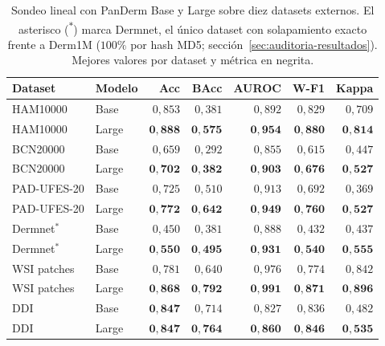 \begin{table}[htbp]
\centering
\footnotesize
\setlength{\tabcolsep}{4pt}
\renewcommand{\arraystretch}{0.95}
\caption{Sondeo lineal con PanDerm Base y Large sobre diez datasets
externos. El asterisco (\textsuperscript{$\ast$}) marca Dermnet, el
único dataset con solapamiento exacto frente a Derm1M ($100\%$ por
hash MD5; sección~\ref{sec:auditoria-resultados}).
Mejores valores por dataset y métrica en negrita.}
\label{tab:lp-panderm}
\begin{tabular}{llrrrrr}
\hline
Dataset       & Modelo & Acc            & BAcc           & AUROC          & W-F1           & Kappa \\
\hline
HAM10000      & Base   & $0{,}853$      & $0{,}381$      & $0{,}892$      & $0{,}829$      & $0{,}709$ \\
HAM10000      & Large  & $\mathbf{0{,}888}$ & $\mathbf{0{,}575}$ & $\mathbf{0{,}954}$ & $\mathbf{0{,}880}$ & $\mathbf{0{,}814}$ \\
BCN20000      & Base   & $0{,}659$      & $0{,}292$      & $0{,}855$      & $0{,}615$      & $0{,}447$ \\
BCN20000      & Large  & $\mathbf{0{,}702}$ & $\mathbf{0{,}382}$ & $\mathbf{0{,}903}$ & $\mathbf{0{,}676}$ & $\mathbf{0{,}527}$ \\
PAD-UFES-20   & Base   & $0{,}725$      & $0{,}510$      & $0{,}913$      & $0{,}692$      & $0{,}369$ \\
PAD-UFES-20   & Large  & $\mathbf{0{,}772}$ & $\mathbf{0{,}642}$ & $\mathbf{0{,}949}$ & $\mathbf{0{,}760}$ & $\mathbf{0{,}527}$ \\
Dermnet$^\ast$& Base   & $0{,}450$      & $0{,}381$      & $0{,}888$      & $0{,}432$      & $0{,}437$ \\
Dermnet$^\ast$& Large  & $\mathbf{0{,}550}$ & $\mathbf{0{,}495}$ & $\mathbf{0{,}931}$ & $\mathbf{0{,}540}$ & $\mathbf{0{,}555}$ \\
WSI patches   & Base   & $0{,}781$      & $0{,}640$      & $0{,}976$      & $0{,}774$      & $0{,}842$ \\
WSI patches   & Large  & $\mathbf{0{,}868}$ & $\mathbf{0{,}792}$ & $\mathbf{0{,}991}$ & $\mathbf{0{,}871}$ & $\mathbf{0{,}896}$ \\
DDI           & Base   & $\mathbf{0{,}847}$ & $0{,}714$      & $0{,}827$      & $0{,}836$      & $0{,}482$ \\
DDI           & Large  & $\mathbf{0{,}847}$ & $\mathbf{0{,}764}$ & $\mathbf{0{,}860}$ & $\mathbf{0{,}846}$ & $\mathbf{0{,}535}$ \\

\end{tabular}
\end{table}
